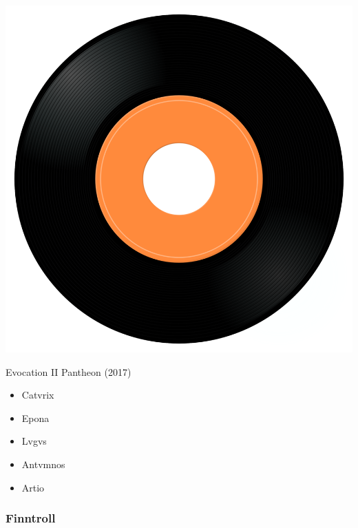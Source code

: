 \begin{minipage}[t]{0.25\textwidth}
\captionsetup{type=figure}
\includegraphics[width=\textwidth]{Images/cover.png}
\caption*{Evocation II Pantheon (2017)}
\end{minipage}
\begin{minipage}[t]{0.25\textwidth}\vspace{0pt}
\begin{itemize}[nosep,leftmargin=1em,labelwidth=*,align=left]
	\setlength{\itemsep}{0pt}
	\item Catvrix
	\item Epona
	\item Lvgvs
	\item Antvmnos
	\item Artio
\end{itemize}
\end{minipage}

\subsubsection{Finntroll}

